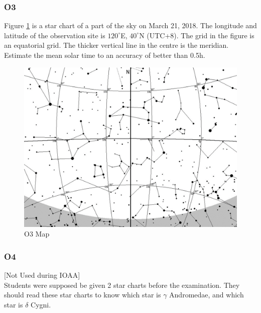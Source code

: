 \documentclass[a4paper,12pt]{extarticle}
\begin{document}
\clearpage
\subsubsection{O3}

Figure \ref{A2018_O3} is a star chart of a part of the sky on March 21, 2018. The longitude and latitude of the observation site is $120^\circ$E, $40^\circ$N (UTC+8). The grid in the figure is an equatorial grid. The thicker vertical line in the centre is the meridian. Estimate the mean solar time to an accuracy of better than 0.5h. 
\begin{figure}[H]
    \centering
    \includegraphics[width=0.95\linewidth]{18_O3.png}
    \caption{O3 Map}
    \label{A2018_O3}
\end{figure}
\clearpage
\subsubsection{O4}
[Not Used during IOAA]\\

Students were supposed be given 2 star charts before the examination. They should read these star charts to know which star is $\gamma$ Andromedae, and which star is $\delta$ Cygni.
\end{document}
